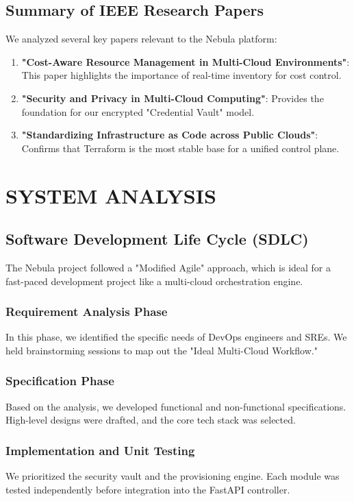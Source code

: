\section{Summary of IEEE Research Papers}
We analyzed several key papers relevant to the Nebula platform:
\begin{enumerate}
    \item \textbf{"Cost-Aware Resource Management in Multi-Cloud Environments"}: This paper highlights the importance of real-time inventory for cost control.
    \item \textbf{"Security and Privacy in Multi-Cloud Computing"}: Provides the foundation for our encrypted "Credential Vault" model.
    \item \textbf{"Standardizing Infrastructure as Code across Public Clouds"}: Confirms that Terraform is the most stable base for a unified control plane.
\end{enumerate}

\newpage
\chapter{SYSTEM ANALYSIS}

\section{Software Development Life Cycle (SDLC)}
The Nebula project followed a "Modified Agile" approach, which is ideal for a fast-paced development project like a multi-cloud orchestration engine.

\subsection{Requirement Analysis Phase}
In this phase, we identified the specific needs of DevOps engineers and SREs. We held brainstorming sessions to map out the "Ideal Multi-Cloud Workflow."

\subsection{Specification Phase}
Based on the analysis, we developed functional and non-functional specifications. High-level designs were drafted, and the core tech stack was selected.

\subsection{Implementation and Unit Testing}
We prioritized the security vault and the provisioning engine. Each module was tested independently before integration into the FastAPI controller.

